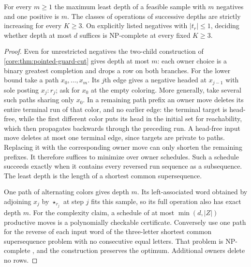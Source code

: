 \begin{corollary}
\label{core:cor:completion-depth-hierarchy}
For every $m\ge1$ the maximum least depth of a feasible sample with
$m$ negatives and one positive is $m$. The classes of operations of
successive depths are strictly increasing for every $K\ge3$.
On explicitly listed negatives with $|t_r|\le1$, deciding whether
depth at most $d$ suffices is NP-complete at every fixed $K\ge3$.
\end{corollary}
\begin{proof}
Even for unrestricted negatives the two-child construction of
\cref{core:thm:pointed-guard-cut} gives depth at most $m$: each owner
choice is a binary greatest completion and drops a row on both branches.
For the lower bound take a path $x_0,\ldots,x_m$. Its $j$th edge gives
a negative headed at $x_{j-1}$ with sole posting $x_j:r_j$; ask for
$x_0$ at the empty coloring. More generally, take several such paths
sharing only $x_0$. In a remaining path prefix an owner move deletes
its entire terminal run of that color, and no earlier edge: the
terminal target is head-free, while the first different color puts
its head in the initial set for reachability, which then propagates
backwards through the preceding run. A head-free input move deletes
at most one terminal edge, since targets are private to paths.
Replacing it with the corresponding owner move can only shorten the
remaining prefixes. It therefore suffices to minimize over owner
schedules. Such a schedule succeeds exactly when it contains every
reversed run sequence as a subsequence. The least depth is the
length of a shortest common supersequence.

One path of alternating colors gives depth $m$. Its left-associated
word obtained by adjoining $x_j$ by $\star_{r_j}$ at step $j$ fits
this sample, so its full operation also has exact depth $m$.
For the complexity claim, a schedule of at most $\min(d,|Z|)$
productive moves is a polynomially checkable certificate. Conversely
use one path for the reverse of each input word of the three-letter
shortest common supersequence problem with no consecutive equal
letters. That problem is NP-complete
\cite[Corollary~6]{LagoutteTavenas2015}, and the construction preserves
the optimum. Additional owners delete no rows.
\end{proof}

